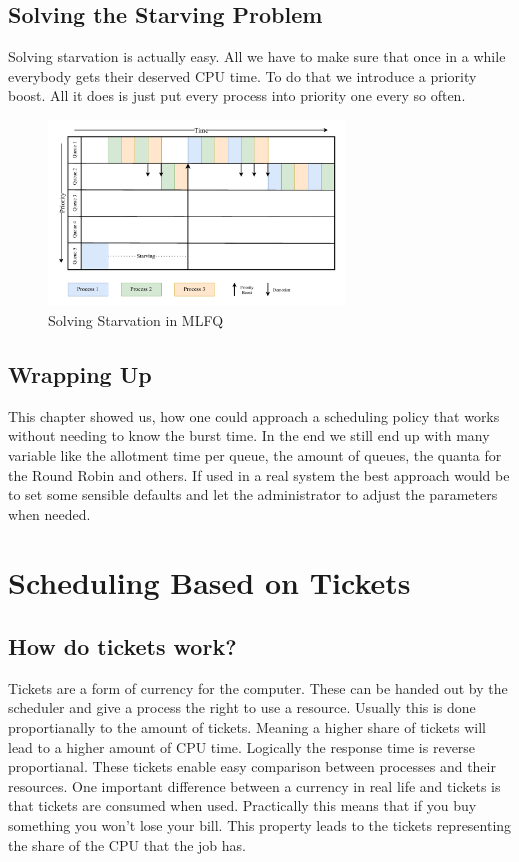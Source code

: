 \section{Solving the Starving Problem}

Solving starvation is actually easy.
All we have to make sure that once in a while everybody gets their deserved CPU time.
To do that we introduce a priority boost. All it does is just put every process into priority one every so often.

\begin{figure}[h]
    \centering
    \includegraphics[width=0.7\textwidth]{Assets/MLFQ-Example-4.pdf}
    \caption{Solving Starvation in MLFQ}
    \label{fig:mlfq-example-4}
\end{figure}

\section{Wrapping Up}

This chapter showed us, how one could approach a scheduling policy that works without needing to know the burst time.
In the end we still end up with many variable like the allotment time per queue, the amount of queues, the quanta for the Round Robin and others.
If used in a real system the best approach would be to set some sensible defaults and let the administrator to adjust the parameters when needed.

\chapter{Scheduling Based on Tickets}

\section{How do tickets work?}

Tickets are a form of currency for the computer.
These can be handed out by the scheduler and give a process the right to use a resource.
Usually this is done proportianally to the amount of tickets.
Meaning a higher share of tickets will lead to a higher amount of CPU time.
Logically the response time is reverse proportianal.
These tickets enable easy comparison between processes and their resources.
One important difference between a currency in real life and tickets is that tickets are consumed when used.
Practically this means that if you buy something you won't lose your bill.
This property leads to the tickets representing the share of the CPU that the job has.

